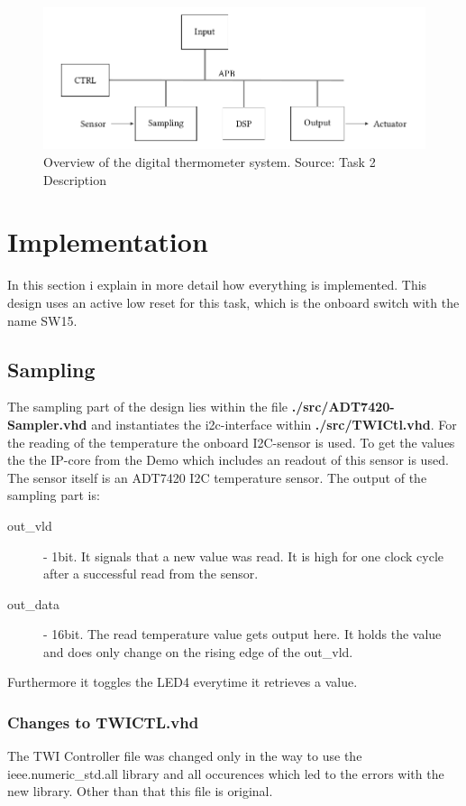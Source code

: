 \documentclass[%
	a4paper,
]
{article}
\begin{document}
\begin{figure}[H]
		\centering
		\includegraphics[width=0.8\linewidth]{fig/system}
		\caption{Overview of the digital thermometer system. Source: Task 2 Description}
		\label{fig:system}
\end{figure}


\section {Implementation}
In this section i explain in more detail how everything is implemented. This design uses
 an active low reset for this task, which is the onboard switch with the name SW15.

\subsection{Sampling}
The sampling part of the design lies within the file \textbf{./src/ADT7420-Sampler.vhd} 
and instantiates the i2c-interface within \textbf{./src/TWICtl.vhd}.
For the reading of the temperature the onboard I2C-sensor is used. To get the values the
 the IP-core from the \autocite{Nexys-4-OOB} Demo which includes an readout of this sensor
 is used.
The sensor itself is an ADT7420 I2C temperature sensor. 
The output of the sampling part is:
\begin{description}
\item[out\_vld] - 1bit. It signals that a new value was read. It is high for one clock cycle after a 
successful read from the sensor.
\item[out\_data] - 16bit. The read temperature value gets output here. It holds the value and does
only change on the rising edge of the out\_vld.
\end{description}
Furthermore it toggles the LED4 everytime it retrieves a value.

\subsubsection{Changes to TWICTL.vhd}
The TWI Controller file was changed only in the way to use the ieee.numeric\_std.all library and 
all occurences which led to the errors with the new library.
Other than that this file is original.
\end{document}
